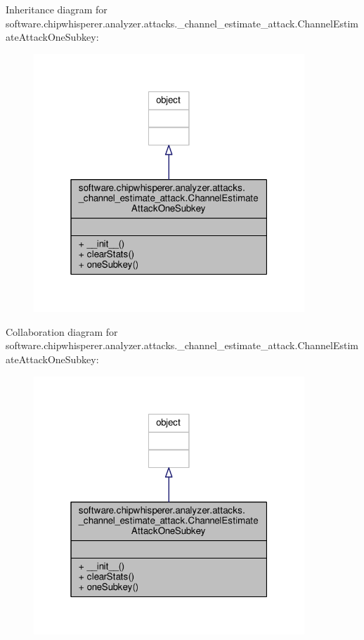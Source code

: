 Inheritance diagram for software.\+chipwhisperer.\+analyzer.\+attacks.\+\_\+channel\+\_\+estimate\+\_\+attack.\+Channel\+Estimate\+Attack\+One\+Subkey\+:\nopagebreak
\begin{figure}[H]
\begin{center}
\leavevmode
\includegraphics[width=289pt]{d9/d01/classsoftware_1_1chipwhisperer_1_1analyzer_1_1attacks_1_1__channel__estimate__attack_1_1ChannelEdddf4ca49a4a1dafef64bc2e586bc124}
\end{center}
\end{figure}


Collaboration diagram for software.\+chipwhisperer.\+analyzer.\+attacks.\+\_\+channel\+\_\+estimate\+\_\+attack.\+Channel\+Estimate\+Attack\+One\+Subkey\+:\nopagebreak
\begin{figure}[H]
\begin{center}
\leavevmode
\includegraphics[width=289pt]{d2/d7a/classsoftware_1_1chipwhisperer_1_1analyzer_1_1attacks_1_1__channel__estimate__attack_1_1ChannelEc8b8ceac623da1d1602d823c101184c4}
\end{center}
\end{figure}


